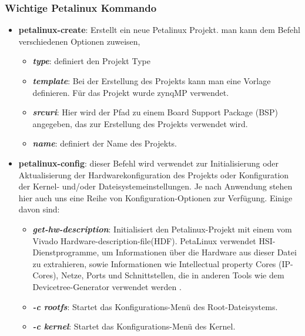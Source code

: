 \subsubsection{Wichtige Petalinux Kommando}
\begin{itemize}
	\item \textbf{petalinux-create}: Erstellt ein neue Petalinux Projekt. man kann dem Befehl verschiedenen Optionen zuweisen, 
	\begin{itemize}
		\item \textbf{\emph{type}}: definiert den Projekt Type
		
		\item \textbf{\emph{template}}: Bei der Erstellung des Projekts kann man eine Vorlage definieren. Für das Projekt wurde zynqMP verwendet.
		
		\item \textbf{\emph{srcuri}}: Hier wird der Pfad zu einem Board Support Package (BSP) angegeben, das zur Erstellung des Projekts verwendet wird. 
		
		\item \textbf{\emph{name}}: definiert der Name des Projekts. 
	\end{itemize}
	
	\item \textbf{petalinux-config}: dieser Befehl wird verwendet zur Initialisierung oder Aktualisierung der Hardwarekonfiguration des Projekts oder Konfiguration der Kernel- und/oder Dateisystemeinstellungen. Je nach Anwendung stehen hier auch uns eine Reihe von Konfiguration-Optionen zur Verfügung. Einige davon sind:
	\begin{itemize}
		\item \textbf{\emph{get-hw-description}}: Initialisiert den Petalinux-Projekt mit einem vom Vivado Hardware-description-file(HDF). PetaLinux verwendet HSI-Dienstprogramme, um Informationen über die Hardware aus dieser Datei zu extrahieren, sowie Informationen wie Intellectual property Cores (IP-Cores), Netze, Ports und Schnittstellen, die in anderen Tools wie dem Devicetree-Generator verwendet werden .
		
		\item \textbf{\emph{-c rootfs}}: Startet das Konfigurations-Menü des Root-Dateisystems.
		
		\item \textbf{\emph{-c kernel}}: Startet das Konfigurations-Menü des Kernel. 
	\end{itemize}
	

\end{itemize}
